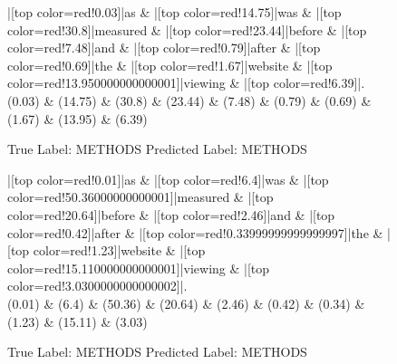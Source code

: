 \documentclass[a4paper, landscape]{article}
\begin{document}
\begin{figure}
\begin{center}
\begin{dependency}
\begin{deptext}
|[top color=red!0.03]|as \& |[top color=red!14.75]|was \& |[top color=red!30.8]|measured \& |[top color=red!23.44]|before \& |[top color=red!7.48]|and \& |[top color=red!0.79]|after \& |[top color=red!0.69]|the \& |[top color=red!1.67]|website \& |[top color=red!13.950000000000001]|viewing \& |[top color=red!6.39]|.\\
(0.03) \& (14.75) \& (30.8) \& (23.44) \& (7.48) \& (0.79) \& (0.69) \& (1.67) \& (13.95) \& (6.39)\\
\end{deptext}
\end{dependency}
\end{center}
\caption{True Label: METHODS Predicted Label: METHODS}
\end{figure}
\clearpage
\begin{figure}
\begin{center}
\begin{dependency}
\begin{deptext}
|[top color=red!0.01]|as \& |[top color=red!6.4]|was \& |[top color=red!50.36000000000001]|measured \& |[top color=red!20.64]|before \& |[top color=red!2.46]|and \& |[top color=red!0.42]|after \& |[top color=red!0.33999999999999997]|the \& |[top color=red!1.23]|website \& |[top color=red!15.110000000000001]|viewing \& |[top color=red!3.0300000000000002]|.\\
(0.01) \& (6.4) \& (50.36) \& (20.64) \& (2.46) \& (0.42) \& (0.34) \& (1.23) \& (15.11) \& (3.03)\\
\end{deptext}
\end{dependency}
\end{center}
\caption{True Label: METHODS Predicted Label: METHODS}
\end{figure}
\end{document}
